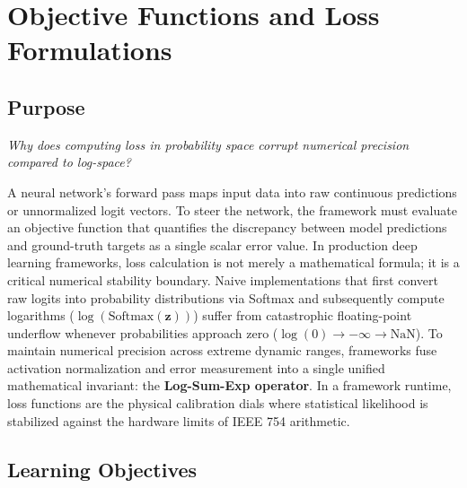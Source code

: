 \documentclass[
  letterpaper,
]{scrbook}
\begin{document}
\chapter{Objective Functions and Loss
Formulations}\label{objective-functions-and-loss-formulations}

\section*{Purpose}\label{purpose-4}


\emph{Why does computing loss in probability space corrupt numerical
precision compared to log-space?}

A neural network's forward pass maps input data into raw continuous
predictions or unnormalized logit vectors. To steer the network, the
framework must evaluate an objective function that quantifies the
discrepancy between model predictions and ground-truth targets as a
single scalar error value. In production deep learning frameworks, loss
calculation is not merely a mathematical formula; it is a critical
numerical stability boundary. Naive implementations that first convert
raw logits into probability distributions via Softmax and subsequently
compute logarithms (\(\log(\text{Softmax}(\mathbf{z}))\)) suffer from
catastrophic floating-point underflow whenever probabilities approach
zero (\(\log(0) \to -\infty \to \text{NaN}\)). To maintain numerical
precision across extreme dynamic ranges, frameworks fuse activation
normalization and error measurement into a single unified mathematical
invariant: the \textbf{Log-Sum-Exp operator}. In a framework runtime,
loss functions are the physical calibration dials where statistical
likelihood is stabilized against the hardware limits of IEEE 754
arithmetic.

\section{Learning Objectives}\label{learning-objectives-4}
\end{document}
